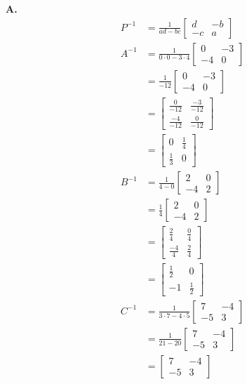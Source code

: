 \documentclass[main.tex]{subfiles}
\begin{document}
\begin{enumerate}
    \textbf{A.}
    $$
    \begin{aligned}
    P^{-1} &=\frac{1}{a d-b c}\left[\begin{array}{cc}
    d & -b \\
    -c & a
    \end{array}\right] \\
    A^{-1} &=\frac{1}{0 \cdot 0-3 \cdot 4}\left[\begin{array}{cc}
    0 & -3 \\
    -4 & 0
    \end{array}\right] \\
    &=\frac{1}{-12}\left[\begin{array}{cc}
    0 & -3 \\
    -4 & 0
    \end{array}\right] \\
    &=\left[\begin{array}{cc}
    \frac{0}{-12} & \frac{-3}{-12} \\
    \frac{-4}{-12} & \frac{0}{-12}
    \end{array}\right] \\
    &=\left[\begin{array}{cc}
    0 & \frac{1}{4} \\
    \frac{1}{3} & 0
    \end{array}\right]\\
    B^{-1} &=\frac{1}{4-0}\left[\begin{array}{cc}
    2 & 0 \\
    -4 & 2
    \end{array}\right] \\
    &=\frac{1}{4}\left[\begin{array}{cc}
    2 & 0 \\
    -4 & 2
    \end{array}\right] \\
    &=\left[\begin{array}{cc}
    \frac{2}{4} & \frac{0}{4} \\
    \frac{-4}{4} & \frac{2}{4}
    \end{array}\right] \\
    &=\left[\begin{array}{cc}
    \frac{1}{2} & 0 \\
    -1 & \frac{1}{2}
    \end{array}\right]\\
    C^{-1} &=\frac{1}{3 \cdot 7-4 \cdot 5}\left[\begin{array}{cc}
    7 & -4 \\
    -5 & 3
    \end{array}\right] \\
    &=\frac{1}{21-20}\left[\begin{array}{cc}
    7 & -4 \\
    -5 & 3
    \end{array}\right] \\
    &=\left[\begin{array}{cc}
    7 & -4 \\
    -5 & 3
    \end{array}\right]
    \end{aligned}
    $$
    

\end{enumerate}
\end{document}

